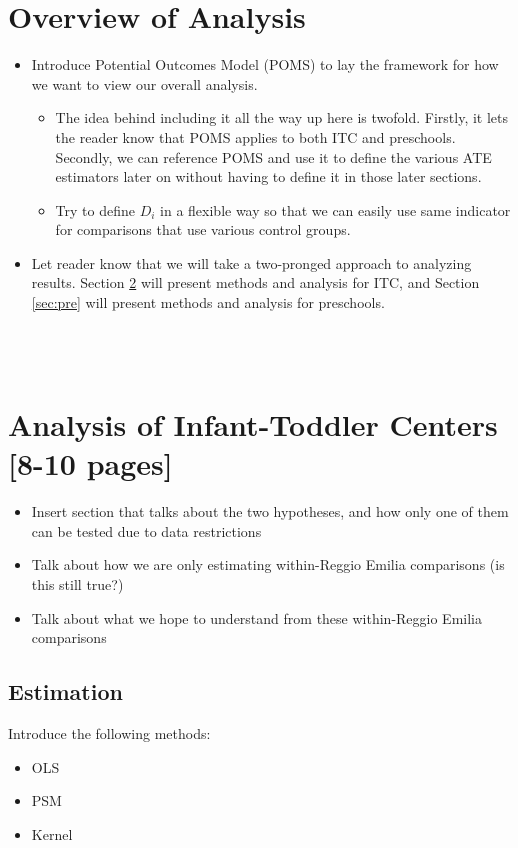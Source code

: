 





\section{Overview of Analysis}
\label{sec:Analysis}

\begin{itemize}
	\item Introduce Potential Outcomes Model (POMS) to lay the framework for how we want to view our overall analysis.
	\begin{itemize}
		\item The idea behind including it all the way up here is twofold. Firstly, it lets the reader know that POMS applies to both ITC and preschools. Secondly, we can reference POMS and use it to define the various ATE estimators later on without having to define it in those later sections.
		\item Try to define $D_i$ in a flexible way so that we can easily use same indicator for comparisons that use various control groups.
	\end{itemize} 
	\item Let reader know that we will take a two-pronged approach to analyzing results. Section \ref{sec:ITC} will present methods and analysis for ITC, and Section \ref{sec:pre} will present methods and analysis for preschools.
\end{itemize}
~\\ ~\\

\section{Analysis of Infant-Toddler Centers [8-10 pages]}
\label{sec:ITC}
\begin{itemize}
	\item Insert section that talks about the two hypotheses, and how only one of them can be tested due to data restrictions
	\item Talk about how we are only estimating within-Reggio Emilia comparisons (is this still true?)
	\item Talk about what we hope to understand from these within-Reggio Emilia comparisons
\end{itemize}
\subsection{Estimation} \label{sec:ITCestimations}
Introduce the following methods:
\begin{itemize}
	\item OLS
	\item PSM
	\item Kernel
\end{itemize}

